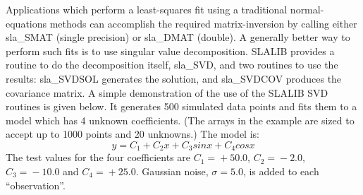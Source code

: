 \documentclass[11pt,twoside]{article}
\begin{document}
Applications which perform a least-squares fit using a traditional
normal-equations methods can accomplish the required matrix-inversion
by calling either
sla\_SMAT
(single precision) or
sla\_DMAT
(double).  A generally better way to perform such fits is
to use singular value decomposition.  SLALIB provides a routine
to do the decomposition itself,
sla\_SVD,
and two routines to use the results:
sla\_SVDSOL
generates the solution, and
sla\_SVDCOV
produces the covariance matrix.
A simple demonstration of the use of the SLALIB SVD
routines is given below.  It generates 500 simulated data
points and fits them to a model which has 4 unknown coefficients.
(The arrays in the example are sized to accept up to 1000
points and 20 unknowns.)  The model is:
\[ y = C_{1} +C_{2}x +C_{3}sin{x} +C_{4}cos{x} \]
The test values for the four coefficients are
$C_1\!=\!+50.0$,
$C_2\!=\!-2.0$,
$C_3\!=\!-10.0$ and
$C_4\!=\!+25.0$.
Gaussian noise, $\sigma=5.0$, is added to each ``observation''.
\goodbreak
\end{document}
